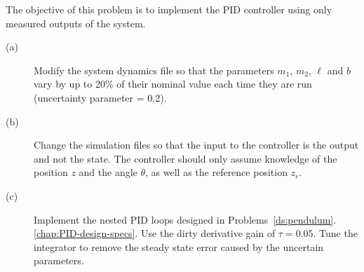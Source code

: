 The objective of this problem is to implement the PID controller using only measured outputs of the system.
\begin{description}
\item[(a)]  Modify the system dynamics file so that the parameters $m_1$, $m_2$, $\ell$ and $b$ vary by up to 20\% of their nominal value each time they are run (uncertainty parameter = 0.2).
\item[(b)]  Change the simulation files so that the input to the controller is the output and not the state.  The controller should only assume knowledge of the position $z$ and the angle $\theta$, as well as the reference position $z_r$.
\item[(c)]  Implement the nested PID loops designed in Problems~\ref{ds:pendulum}.\ref{chap:PID-design-specs}.  Use the dirty derivative gain of $\tau=0.05$. Tune the integrator to remove the steady state error caused by the uncertain parameters.
\end{description}

